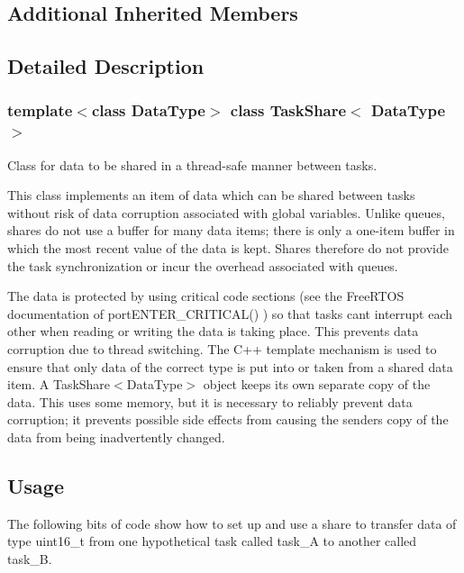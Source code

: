 \subsection*{Additional Inherited Members}


\subsection{Detailed Description}
\subsubsection*{template$<$class Data\+Type$>$\newline
class Task\+Share$<$ Data\+Type $>$}

Class for data to be shared in a thread-\/safe manner between tasks. 

This class implements an item of data which can be shared between tasks without risk of data corruption associated with global variables. Unlike queues, shares do not use a buffer for many data items; there is only a one-\/item buffer in which the most recent value of the data is kept. Shares therefore do not provide the task synchronization or incur the overhead associated with queues.

The data is protected by using critical code sections (see the Free\+R\+T\+OS documentation of {\ttfamily port\+E\+N\+T\+E\+R\+\_\+\+C\+R\+I\+T\+I\+C\+A\+L()} ) so that tasks can\textquotesingle{}t interrupt each other when reading or writing the data is taking place. This prevents data corruption due to thread switching. The C++ template mechanism is used to ensure that only data of the correct type is put into or taken from a shared data item. A {\ttfamily Task\+Share$<$\+Data\+Type$>$} object keeps its own separate copy of the data. This uses some memory, but it is necessary to reliably prevent data corruption; it prevents possible side effects from causing the sender\textquotesingle{}s copy of the data from being inadvertently changed.\hypertarget{index_Usage}{}\subsection{Usage}\label{index_Usage}
The following bits of code show how to set up and use a share to transfer data of type {\ttfamily uint16\+\_\+t} from one hypothetical task called {\ttfamily task\+\_\+A} to another called {\ttfamily task\+\_\+B}.

